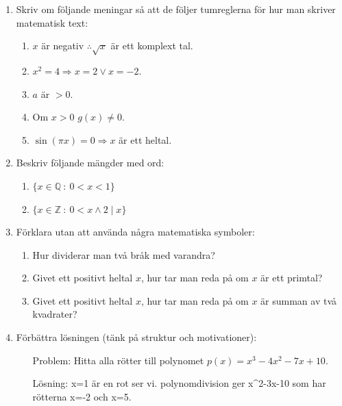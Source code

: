 \documentclass[titlepage]{article}
\begin{document}
\begin{enumerate}
    \item Skriv om följande meningar så att de följer tumreglerna för hur man skriver matematisk text:
    \begin{enumerate}[label=(\alph*)]
        \item $x$ är negativ $\therefore \sqrt{x}$ är ett komplext tal.
        \item $x^2 = 4 \Rightarrow x=2 \vee x=-2$.
        \item $a$ är $>0$.
        \item Om $x>0$ $g(x) \neq 0$.
        \item $\sin(\pi x)= 0\Rightarrow x$ är ett heltal. 
    \end{enumerate}
    \item Beskriv följande mängder med ord:
    \begin{enumerate}
        \item $\{x \in \mathbb{Q} \: : \: 0<x<1\}$
        \item $\{x \in \mathbb{Z} \: : \: 0 < x \wedge 2 \mid x\}$
    \end{enumerate}
    \item Förklara utan att använda några matematiska symboler:
    \begin{enumerate}[label=(\alph*)]
        \item Hur dividerar man två bråk med varandra?
        \item Givet ett positivt heltal $x$, hur tar man reda på om $x$ är ett primtal?
        \item Givet ett positivt heltal $x$, hur tar man reda på om $x$ är summan av två kvadrater?
    \end{enumerate}
    \item Förbättra lösningen (tänk på struktur och motivationer):
    \begin{enumerate}[leftmargin=20mm]
        \item[Problem:] Hitta alla rötter till polynomet $p(x)=x^3 - 4x^2 - 7x + 10$.
        \item[Lösning:] x=1 är en rot ser vi. polynomdivision ger x\textasciicircum2-3x-10 som har rötterna x=-2 och x=5.
    \end{enumerate}
\end{enumerate}




\newpage

\end{document}
